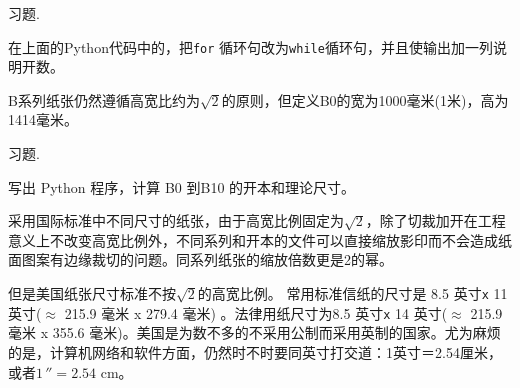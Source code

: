 \documentclass[main.tex]{subfiles}
\begin{document}
\begin{kaishu}习题.\end{kaishu} 在上面的Python代码中的，把\texttt{for} 循环句改为\texttt{while}循环句，并且使输出加一列说明开数。

B系列纸张仍然遵循高宽比约为$\sqrt{2}$的原则，但定义B0的宽为1000毫米(1米)，高为1414毫米。

\begin{kaishu}习题.\end{kaishu} 写出 Python 程序，计算 B0 到B10 的开本和理论尺寸。 

采用国际标准中不同尺寸的纸张，由于高宽比例固定为$\sqrt{2}$，除了切裁加开在工程意义上不改变高宽比例外，不同系列和开本的文件可以直接缩放影印而不会造成纸面图案有边缘裁切的问题。同系列纸张的缩放倍数更是2的幂。

但是美国纸张尺寸标准不按$\sqrt{2}$的高宽比例。 常用标准信纸的尺寸是 8.5 英寸\texttt{x}{ }11 英寸($\approx$ 215.9 毫米 x 279.4 毫米) 。法律用纸尺寸为8.5 英寸\texttt{x}{ }14 英寸($\approx$ 215.9 毫米 x 355.6 毫米)。美国是为数不多的不采用公制而采用英制的国家。尤为麻烦的是，计算机网络和软件方面，仍然时不时要同英寸打交道：1英寸＝2.54厘米，或者$1\,'' = 2.54$ cm。
\newpage
\end{document}
